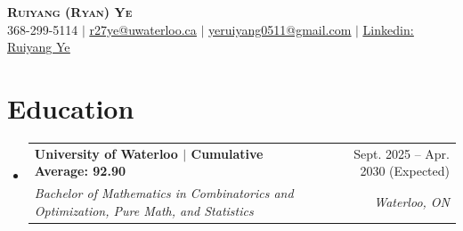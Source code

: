 \documentclass[letterpaper,11pt]{article}
\makeatletter
\newcommand{\resumeSubheading}[4]{
  \vspace{-2pt}\item
    \begin{tabular*}{0.97\textwidth}[t]{l@{\extracolsep{\fill}}r}
      \textbf{#1} & #2 \\
      \textit{\small#3} & \textit{\small #4} \\
    \end{tabular*}\vspace{-7pt}
}
\newcommand{\resumeSubHeadingListStart}{\begin{itemize}[leftmargin=0.15in, label={}]}
\newcommand{\resumeSubHeadingListEnd}{\end{itemize}}
\makeatother
\begin{document}

\begin{center}
    \textbf{\Huge \scshape Ruiyang (Ryan) Ye} \\ \vspace{1pt}
    \small 368-299-5114 $|$ \href{mailto:r27ye@uwaterloo.ca}{\underline{r27ye@uwaterloo.ca}} $|$ \href{mailto:yeruiyang0511@gmail.com}{\underline{yeruiyang0511@gmail.com}} $|$ 
    \href{https://www.linkedin.com/in/ruiyang-ye-992b66298/}{\underline{Linkedin: Ruiyang Ye}}
\end{center}



\section{Education}
  \resumeSubHeadingListStart
    \resumeSubheading
      {University of Waterloo $|$ Cumulative Average: 92.90}{Sept. 2025 -- Apr. 2030 (Expected)}
      {Bachelor of Mathematics in Combinatorics and Optimization, Pure Math, and Statistics}{Waterloo, ON}
  \resumeSubHeadingListEnd

\end{document}
